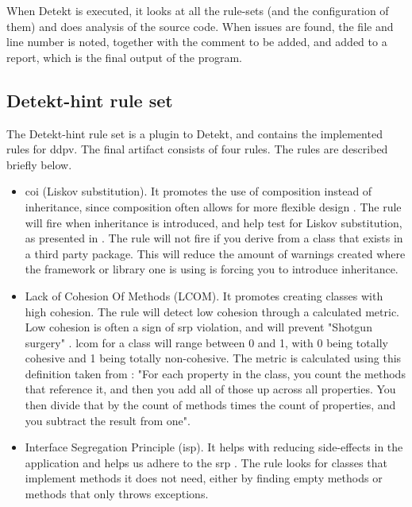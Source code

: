 \documentclass[pdftex,10pt,b5paper,twoside]{report}
\begin{document}
When Detekt is executed, it looks at all the rule-sets (and the configuration of them) and does analysis of the source code. When issues are found, the file and line number is noted, together with the comment to be added, and added to a report, which is the final output of the program. 

\subsection{Detekt-hint rule set}
The Detekt-hint rule set is a plugin to Detekt, and contains the implemented rules for \gls{ddpv}. The final artifact consists of four rules. The rules are described briefly below.

\begin{itemize}
    \item\gls{coi} (Liskov substitution). It promotes the use of composition instead of inheritance, since composition often allows for more flexible design \cite{composition-over-inheritance-wiki}. The rule will fire when inheritance is introduced, and help test for Liskov substitution, as presented in \cite{composition-over-inheritance-stackoverflow}. The rule will not fire if you derive from a class that exists in a third party package. This will reduce the amount of warnings created where the framework or library one is using is forcing you to introduce inheritance.
    
    \item Lack of Cohesion Of Methods (LCOM). It promotes creating classes with high cohesion. The rule will detect low cohesion through a calculated metric. Low cohesion is often a sign of \gls{srp} violation, and will prevent "Shotgun surgery" \cite{lcomdescription}. \gls{lcom} for a class will range between 0 and 1, with 0 being totally cohesive and 1 being totally non-cohesive. The metric is calculated using this definition taken from \cite{lcomdescription}: "For each property in the class, you count the methods that reference it, and then you add all of those up across all properties. You then divide that by the count of methods times the count of properties, and you subtract the result from one".
    
    \item Interface Segregation Principle (\gls{isp}). It helps with reducing side-effects in the application and helps us adhere to the \gls{srp} \cite{isp-violation}. The rule looks for classes that implement methods it does not need, either by finding empty methods or methods that only throws exceptions.
    

\end{itemize}
\end{document}
